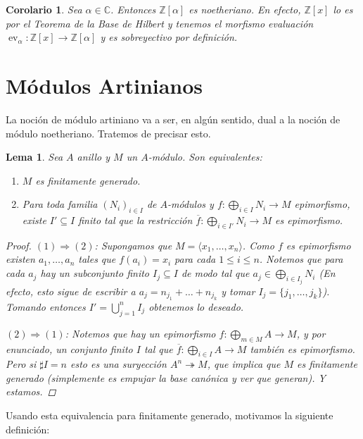 \documentclass[12pt]{book}
\newtheorem{lem}[teo]{Lema}
\newtheorem{cor}[teo]{Corolario}
\theoremstyle{definition}
\newcommand{\CC}{\mathbb{C}}
\newcommand{\ZZ}{\mathbb{Z}}      %
\DeclareMathOperator{\ev}{ev}
\begin{document}
\begin{cor}
Sea $\alpha\in\CC$. Entonces $\ZZ[\alpha]$ es noetheriano. En efecto, $\ZZ[x]$ lo es por el Teorema de la Base de Hilbert y tenemos el morfismo evaluación $\ev_{\alpha}:\ZZ[x]\to \ZZ[\alpha]$ y es sobreyectivo por definición.
\end{cor}

\section{Módulos Artinianos}

La noción de módulo artiniano va a ser, en algún sentido, dual a la noción de módulo noetheriano. Tratemos de precisar esto.

\begin{lem} Sea $A$ anillo y $M$ un $A$-módulo.
Son equivalentes: \begin{enumerate}\item $M$ es finitamente generado.\item Para toda familia $(N_i)_{i\in I}$ de $A$-módulos y $f:\displaystyle\bigoplus_{i\in I}N_i\to M$ epimorfismo, existe $I'\subseteq I$ finito tal que la restricción $\overline{f}:\displaystyle\bigoplus_{i\in I'}N_i\to M$ es epimorfismo.\end{enumerate}
\begin{proof}
$(1)\Longrightarrow (2)$: Supongamos que $M=\langle x_1,\ldots , x_n\rangle$. Como $f$ es epimorfismo existen $a_1,\ldots ,a_n$ tales que $f(a_i)=x_i$ para cada $1\leq i\leq n$. Notemos que para cada $a_j$ hay un subconjunto finito $I_j\subseteq I$ de modo tal que $a_j\in\displaystyle\bigoplus_{i\in I_j}N_i$ (En efecto, esto sigue de escribir a $a_j = n_{j_1}+\ldots + n_{j_k}$ y tomar $I_j = \{j_1,\ldots , j_k\}$). Tomando entonces $I' = \displaystyle\bigcup_{j=1}^n I_j$ obtenemos lo deseado.

$(2)\Longrightarrow (1)$: Notemos que hay un epimorfismo $f:\displaystyle\bigoplus_{m\in M}A\to M$, y por enunciado, un conjunto finito $I$ tal que $\overline{f}:\displaystyle\bigoplus_{i\in I} A \to M$ también es epimorfismo. Pero si $\sharp I = n$ esto es una suryección $A^n\twoheadrightarrow M$, que implica que $M$ es finitamente generado (simplemente es empujar la base canónica y ver que generan). Y estamos.
\end{proof}
\end{lem}

Usando esta equivalencia para finitamente generado, motivamos la siguiente definición:
\end{document}

